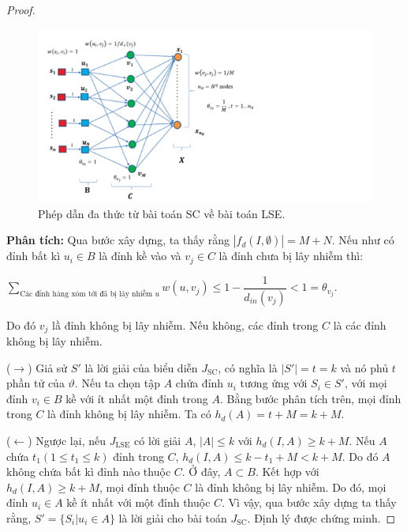 \begin{proof}
\begin {itemize}
	\begin{figure}[H]
		\begin{center}
			\includegraphics [scale=0.8]{picture/Hinh3_3}
			\caption{Phép dẫn đa thức từ bài toán SC về bài toán LSE.}
			\label{refhinh3_3}
		\end{center}
	\end{figure}
	\end {itemize}
	{\bfseries Phân tích:} Qua bước xây dựng, ta thấy rằng $| f_{d}(I,\emptyset) | = M + N$. Nếu như có đỉnh bất kì $u_{i} \in B$ là đỉnh kề vào và $v_{j} \in C$ là đỉnh chưa bị lây nhiễm thì: 
	\begin{center}
		$\sum_{\text{Các đỉnh hàng xóm tới đã bị lây nhiễm $u$}} w(u, v_{j}) \leq 1 - \dfrac{1}{d_{in}(v_{j})} < 1 = \theta_{v_{j}}$.
	\end{center}
	
	Do đó $v_{j}$ lầ đỉnh không bị lây nhiễm. Nếu không, các đỉnh trong $C$ là các đỉnh không bị lây nhiễm.
	
	($\rightarrow$) Giả sử $S'$ là lời giải của biểu diễn $J_{\text{SC}}$, có nghĩa là $| S' | = t = k$ và nó phủ $t$ phần tử của $\vartheta$. Nếu ta chọn tập $A$ chứa đỉnh $u_{i}$ tương ứng với $S_{i} \in S'$, với mọi đỉnh $v_{i} \in B$ kề với ít nhất một đỉnh trong $A$. Bằng bước phân tích trên, mọi đỉnh trong $C$ là đỉnh không bị lây nhiễm. Ta có $h_{d}(A) = t + M = k + M$.
	
	($\leftarrow$) Ngược lại, nếu $J_{\text{LSE}}$ có lời giải $A$, $|A| \leq k$ với $h_{d}(I, A) \geq k + M$. Nếu $A$ chứa $t_{1} (1 \leq t_{1} \leq k)$ đỉnh trong $C$, $h_{d}(I, A) \leq k - t_{1} + M < k + M$. Do đó $A$ không chứa bất kì đỉnh nào thuộc $C$. Ở đây, $A \subset B$. Kết hợp với $h_{d}(I, A) \geq k + M$, mọi đỉnh thuộc $C$ là đỉnh không bị lây nhiễm. Do đó, mọi đỉnh $u_{i} \in A$ kề ít nhất với một đỉnh thuộc $C$. Vì vậy, qua bước xây dựng ta thấy rằng, $S' = \{ S_{i} | u_{i} \in A \}$ là lời giải cho bài toán $J_{\text{SC}}$. Định lý được chứng minh.
\end{proof}

